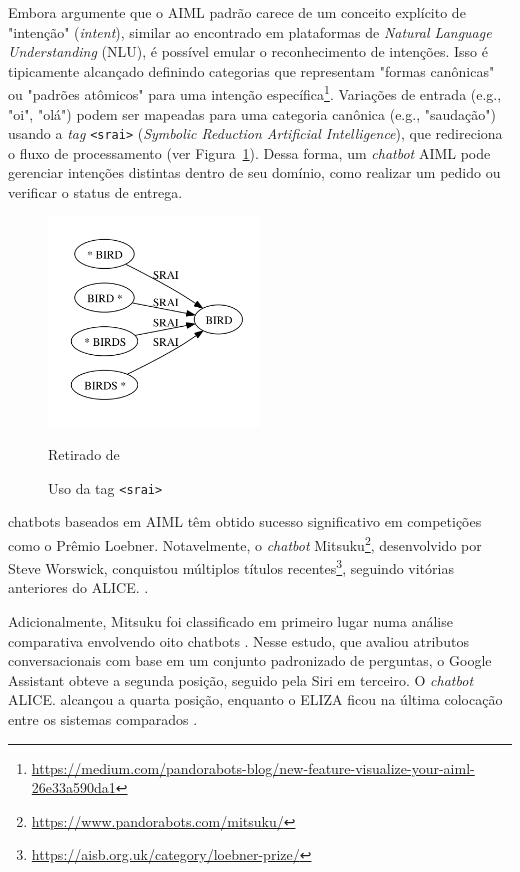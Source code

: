 \documentclass[14pt,a4paper,oneside]{book}
\begin{document}
Embora \cite{Hohn2019} argumente que o AIML padrão carece de um conceito explícito de "intenção" (\emph{intent}), similar ao encontrado em plataformas de \emph{Natural Language Understanding} (NLU), é possível emular o reconhecimento de intenções. Isso é tipicamente alcançado definindo categorias que representam "formas canônicas" ou "padrões atômicos" para uma intenção específica\footnote{\url{https://medium.com/pandorabots-blog/new-feature-visualize-your-aiml-26e33a590da1}}. Variações de entrada (e.g., "oi", "olá") podem ser mapeadas para uma categoria canônica (e.g., "saudação") usando a \emph{tag} \texttt{<srai>} (\emph{Symbolic Reduction Artificial Intelligence}), que redireciona o fluxo de processamento (ver Figura~\ref{fig:sodatagsrai}). Dessa forma, um \emph{chatbot} AIML pode gerenciar intenções distintas dentro de seu domínio, como realizar um pedido ou verificar o status de entrega.

\begin{figure}
    \centering
    \caption{Uso da tag \texttt{<srai>}}
    \includegraphics[width=0.5\textwidth]{./fig/image13.png} %
    \label{fig:sodatagsrai}
    \vspace{0.2cm} %
    {\footnotesize 
	
	Retirado de \cite{DeGasperis2013}}
\end{figure}

chatbots baseados em AIML têm obtido sucesso significativo em competições como o Prêmio Loebner. Notavelmente, o \emph{chatbot} Mitsuku\footnote{\url{https://www.pandorabots.com/mitsuku/}}, desenvolvido por Steve Worswick, conquistou múltiplos títulos recentes\footnote{\url{https://aisb.org.uk/category/loebner-prize/}}, seguindo vitórias anteriores do ALICE. \cite{Wallace2000}.

Adicionalmente, Mitsuku foi classificado em primeiro lugar numa análise comparativa envolvendo oito chatbots \cite{Sharma2020}. Nesse estudo, que avaliou atributos conversacionais com base em um conjunto padronizado de perguntas, o Google Assistant obteve a segunda posição, seguido pela Siri em terceiro. O \emph{chatbot} ALICE. alcançou a quarta posição, enquanto o ELIZA ficou na última colocação entre os sistemas comparados \cite{Sharma2020}.
\end{document}
